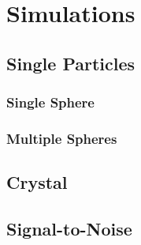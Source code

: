 \chapter{Simulations}
\section{Single Particles}
\subsection{Single Sphere}
\subsection{Multiple Spheres}
\section{Crystal}
\section{Signal-to-Noise}

